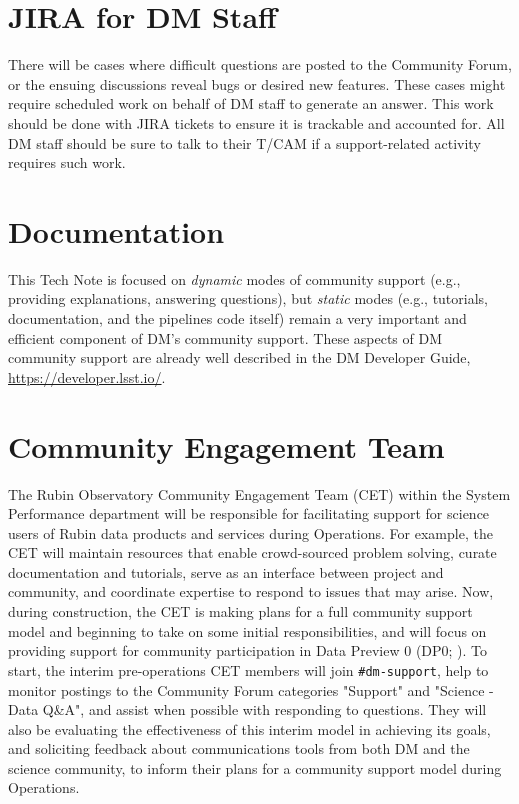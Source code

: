 \documentclass[DM,lsstdraft,authoryear,toc]{lsstdoc}
\begin{document}
\section{JIRA for DM Staff}\label{sec:jira}

There will be cases where difficult questions are posted to the Community Forum, or the ensuing discussions reveal bugs or desired new features.
These cases might require scheduled work on behalf of DM staff to generate an answer.
This work should be done with \gls{JIRA} tickets to ensure it is trackable and accounted for.
All DM staff should be sure to talk to their \gls{T/CAM} if a support-related activity requires such work.

\section{Documentation}\label{sec:doc}

This Tech Note is focused on {\it dynamic} modes of community support (e.g., providing explanations, answering questions), but {\it static} modes (e.g., tutorials, documentation, and the pipelines code itself) remain a very important and efficient component of DM's community support.
These aspects of DM community support are already well described in the DM Developer Guide, \url{https://developer.lsst.io/}.

\section{Community Engagement Team}\label{sec:cet}

The Rubin Observatory Community Engagement Team (CET) within the System Performance department will be responsible for facilitating support for science users of Rubin data products and services during Operations.
For example, the CET will maintain resources that enable crowd-sourced problem solving, curate documentation and tutorials, serve as an interface between project and community, and coordinate expertise to respond to issues that may arise.
Now, during construction, the CET is making plans for a full community support model and beginning to take on some initial responsibilities, and will focus on providing support for community participation in Data Preview 0 (DP0; ).
To start, the interim pre-operations CET members will join {\tt \#dm-support}, help to monitor postings to the Community Forum categories "Support" and "Science - Data Q\&A", and assist when possible with responding to questions.
They will also be evaluating the effectiveness of this interim model in achieving its goals, and soliciting feedback about communications tools from both DM and the science community, to inform their plans for a community support model during Operations.
\end{document}
